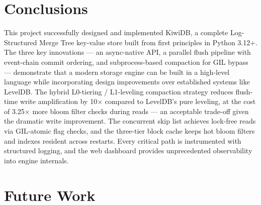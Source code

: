 \documentclass[oneside,a4paper,12pt]{book}
\begin{document}
\section{Conclusions}

This project successfully designed and implemented KiwiDB, a complete Log-Structured Merge Tree key-value store built from first principles in Python 3.12+. The three key innovations --- an async-native API, a parallel flush pipeline with event-chain commit ordering, and subprocess-based compaction for GIL bypass --- demonstrate that a modern storage engine can be built in a high-level language while incorporating design improvements over established systems like LevelDB. The hybrid L0-tiering / L1-leveling compaction strategy reduces flush-time write amplification by 10$\times$ compared to LevelDB's pure leveling, at the cost of 3.25$\times$ more bloom filter checks during reads --- an acceptable trade-off given the dramatic write improvement. The concurrent skip list achieves lock-free reads via GIL-atomic flag checks, and the three-tier block cache keeps hot bloom filters and indexes resident across restarts. Every critical path is instrumented with structured logging, and the web dashboard provides unprecedented observability into engine internals.

\section{Future Work}
\end{document}

